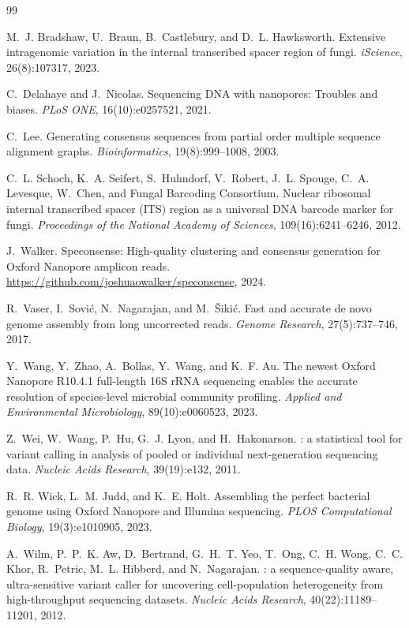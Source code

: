 \documentclass[11pt]{article}
\begin{document}
\begin{thebibliography}{99}

M.~J. Bradshaw, U.~Braun, B.~Castlebury, and D.~L. Hawksworth.
\newblock Extensive intragenomic variation in the internal transcribed spacer
region of fungi.
\newblock \emph{iScience}, 26(8):107317, 2023.

C.~Delahaye and J.~Nicolas.
\newblock Sequencing {DNA} with nanopores: Troubles and biases.
\newblock \emph{PLoS ONE}, 16(10):e0257521, 2021.

C.~Lee.
\newblock Generating consensus sequences from partial order multiple sequence
alignment graphs.
\newblock \emph{Bioinformatics}, 19(8):999--1008, 2003.

C.~L. Schoch, K.~A. Seifert, S.~Huhndorf, V.~Robert, J.~L. Spouge, C.~A.
Levesque, W.~Chen, and Fungal Barcoding Consortium.
\newblock Nuclear ribosomal internal transcribed spacer ({ITS}) region as a
universal {DNA} barcode marker for fungi.
\newblock \emph{Proceedings of the National Academy of Sciences},
109(16):6241--6246, 2012.

J.~Walker.
\newblock Speconsense: High-quality clustering and consensus generation for
{Oxford Nanopore} amplicon reads.
\newblock \url{https://github.com/joshuaowalker/speconsense}, 2024.

R.~Vaser, I.~Sovi\'{c}, N.~Nagarajan, and M.~\v{S}iki\'{c}.
\newblock Fast and accurate de novo genome assembly from long uncorrected reads.
\newblock \emph{Genome Research}, 27(5):737--746, 2017.

Y.~Wang, Y.~Zhao, A.~Bollas, Y.~Wang, and K.~F. Au.
\newblock The newest {Oxford Nanopore} {R10.4.1} full-length {16S} {rRNA}
sequencing enables the accurate resolution of species-level microbial community
profiling.
\newblock \emph{Applied and Environmental Microbiology}, 89(10):e0060523, 2023.

Z.~Wei, W.~Wang, P.~Hu, G.~J. Lyon, and H.~Hakonarson.
: a statistical tool for variant calling in analysis of pooled
or individual next-generation sequencing data.
\newblock \emph{Nucleic Acids Research}, 39(19):e132, 2011.

R.~R. Wick, L.~M. Judd, and K.~E. Holt.
\newblock Assembling the perfect bacterial genome using {Oxford Nanopore} and
{Illumina} sequencing.
\newblock \emph{PLOS Computational Biology}, 19(3):e1010905, 2023.

A.~Wilm, P.~P.~K. Aw, D.~Bertrand, G.~H.~T. Yeo, T.~Ong, C.~H. Wong,
C.~C. Khor, R.~Petric, M.~L. Hibberd, and N.~Nagarajan.
: a sequence-quality aware, ultra-sensitive variant caller for
uncovering cell-population heterogeneity from high-throughput sequencing
datasets.
\newblock \emph{Nucleic Acids Research}, 40(22):11189--11201, 2012.

\end{thebibliography}
\end{document}
